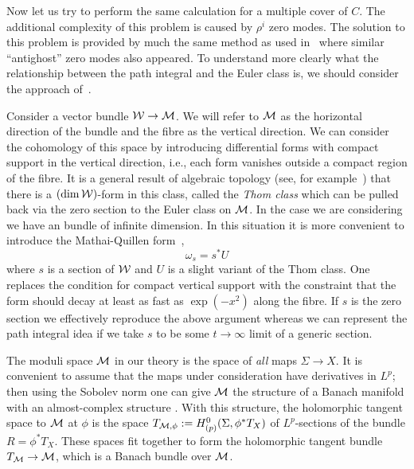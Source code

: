 Now let us try to perform the same calculation for a multiple cover of
$C$. The additional complexity of this problem is caused by $\rho^i$
zero modes. The solution to this problem is provided by much the same
method as used in~\cite{W:matrx} where similar ``antighost'' zero
modes also appeared. To understand more clearly what the relationship
between the path integral and the Euler class is, we should consider
the approach of~\cite{AJ:}.

Consider a vector bundle $\cal{W}\to\cal{M}$. We will refer to $\cal{M}$ as the
horizontal direction of the bundle and the fibre as the vertical direction.
We can consider the cohomology of
this space by introducing differential forms with compact support in
the vertical direction, i.e., each form vanishes outside a compact
region of the fibre.
It is a general result of algebraic topology (see, for
example~\cite{BT:diff}) that there is a $(\dim\cal{W})$-form in this class,
called the {\em Thom class\/} which can be pulled back via the zero
section to the Euler class on $\cal{M}$. In the case we are considering we
have an bundle of infinite dimension. In this situation
it is more convenient to introduce the Mathai-Quillen
form~\cite{MQ:form},
\begin{equation}
  \omega_s=s^*U
\end{equation}
where $s$ is a section of $\cal{W}$ and $U$ is a slight variant of the Thom
class. One replaces the condition for compact vertical
support with the constraint that the form should decay at least as
fast as $\exp(-x^2)$ along the fibre. If $s$ is the zero section we
effectively reproduce the above argument whereas we can represent the
path integral idea if we take $s$ to be some $t\to\infty$ limit of a
generic section.

The moduli space $\cal{M}$ in our theory is the space of {\em all\/} maps
$\Sigma\to X$.  It is convenient to assume that the maps under consideration
have derivatives in $L^p$; then using the Sobolev norm one can give $\cal{M}$
the structure of a Banach manifold with an almost-complex structure
\cite{McD:,Klg:}.  With this structure, the holomorphic tangent space to
$\cal{M}$ at $\phi$ is the space $T_{{\cal{M}},\phi}:=H^0_{(p)}(\Sigma,\phi^*T_X)$
of $L^p$-sections of the bundle $R=\phi^*T_X$.  These spaces fit together
to form the holomorphic tangent bundle $T_{{\cal{M}}}\to\cal{M}$, which is a
Banach bundle over $\cal{M}$.

